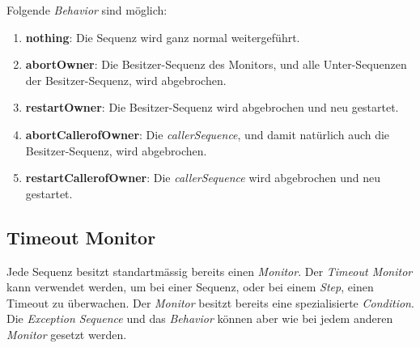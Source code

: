 Folgende \textit{Behavior} sind möglich:
\begin{enumerate}
\item \textbf{nothing}: Die Sequenz wird ganz normal weitergeführt.
\item \textbf{abortOwner}: Die Besitzer-Sequenz des Monitors, und alle Unter-Sequenzen der Besitzer-Sequenz, wird abgebrochen.
\item \textbf{restartOwner}: Die Besitzer-Sequenz wird abgebrochen und neu gestartet.
\item \textbf{abortCallerofOwner}: Die \textit{callerSequence}, und damit natürlich auch die Besitzer-Sequenz, wird abgebrochen.
\item \textbf{restartCallerofOwner}: Die \textit{callerSequence} wird abgebrochen und neu gestartet.
\end{enumerate}



\subsection{Timeout Monitor}
\label{monitorTimeout}
Jede Sequenz besitzt standartmässig bereits einen \textit{Monitor}.
Der \textit{Timeout Monitor} kann verwendet werden, um bei einer Sequenz, oder bei einem \textit{Step}, einen Timeout zu überwachen.
Der \textit{Monitor} besitzt bereits eine spezialisierte \textit{Condition}.
Die \textit{Exception Sequence} und das \textit{Behavior} können aber wie bei jedem anderen \textit{Monitor} gesetzt werden.





